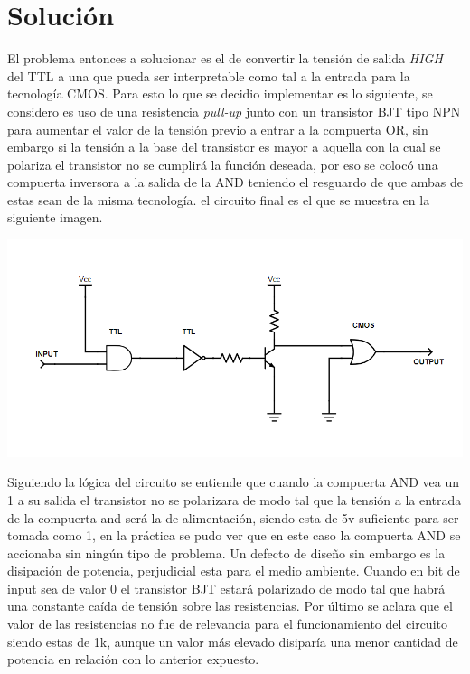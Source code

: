 \section{Solución}
El problema entonces a solucionar es el de convertir la tensión de salida \textit{HIGH} del TTL a una que pueda ser interpretable como tal a la entrada para la tecnología CMOS.
Para esto lo que se decidio implementar es lo siguiente, se considero es uso de una resistencia \textit{pull-up} junto con un transistor BJT tipo NPN para aumentar el valor de la tensión previo a entrar a la compuerta OR, sin embargo si la tensión a la base del transistor es mayor a aquella con la cual se polariza el transistor no se cumplirá la función deseada, por eso se colocó una compuerta inversora a la salida de la AND teniendo el resguardo de que ambas de estas sean de la misma tecnología. el circuito final es el que se muestra en la siguiente imagen.
\begin{center}
	\includegraphics[scale = 0.8,keepaspectratio]{../5-TTL&CMOS/E3-ej5-corregido.png}
\end{center}

Siguiendo la lógica del circuito se entiende que cuando la compuerta AND vea un 1 a su salida el transistor no se polarizara de modo tal que la tensión a la entrada de la compuerta and será la de alimentación, siendo esta de 5v suficiente para ser tomada como 1, en la práctica se pudo ver que en este caso la compuerta AND se accionaba sin ningún tipo de problema.
Un defecto de diseño sin embargo es la disipación de potencia, perjudicial esta para el medio ambiente. Cuando en bit de input sea de valor 0 el transistor BJT estará polarizado de modo tal que habrá una constante caída de tensión sobre las resistencias.
Por último se aclara que el valor de las resistencias no fue de relevancia para el funcionamiento del circuito siendo estas de 1k, aunque un valor más elevado disiparía una menor cantidad de potencia en relación con lo anterior expuesto.
